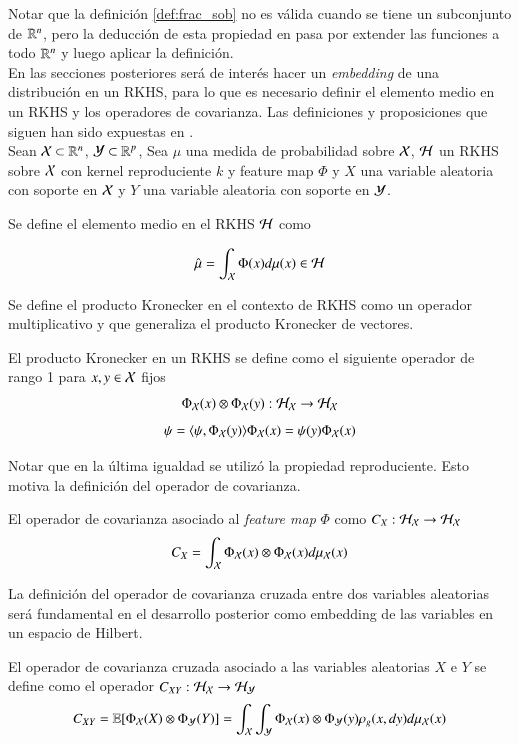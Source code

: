 Notar que la definición \ref{def:frac_sob} no es válida cuando se tiene un subconjunto de $\mathbb{R}^n$, pero la deducción de esta propiedad en \cite{Wendland2004ScatteredApproximation} pasa por extender las funciones a todo $\mathbb{R}^n$ y luego aplicar la definición. \\
En las secciones posteriores será de interés hacer un \textit{embedding} de una distribución en un RKHS, para lo que es necesario definir el elemento medio en un RKHS y los operadores de covarianza. Las definiciones y proposiciones que siguen han sido expuestas en \cite{Fukumizu2004DimensionalitySpaces, Song2009HilbertSystems, Muandet2017KernelBeyond}. \\
Sean $\mathcal{X} \subset \mathbb{R}^n$, $\mathcal{Y} \subset \mathbb{R}^p$,  Sea $\mu$ una medida de probabilidad sobre $\mathcal{X}$, $\mathcal{H}$ un RKHS sobre $\mathcal{X}$ con kernel reproduciente $k$ y feature map $\Phi$ y $X$ una variable aleatoria con soporte en $\mathcal{X}$ y $Y$ una variable aleatoria con soporte en $\mathcal{Y}$.
\begin{defn}
	Se define el elemento medio en el RKHS $\mathcal{H}$ como
	
	\begin{equation*}
		\hat \mu = \int_{\mathcal{X}} \Phi (x) d \mu (x) \in \mathcal{H}
	\end{equation*}
\end{defn}
Se define el producto Kronecker en el contexto de RKHS como un operador multiplicativo y que generaliza el producto Kronecker de vectores.
\begin{defn}
    El producto Kronecker en un RKHS se define como
    el siguiente operador de rango 1 para $x, y \in \mathcal{X}$ fijos
	$$ \Phi_{\mathcal{X}} (x) \otimes \Phi_{\mathcal{X}}(y) : \mathcal{H}_{\mathcal{X}} \to \mathcal{H}_{\mathcal{X}}$$
	\begin{equation*}
		[\Phi_\X (x) \otimes \Phi_\X(y)] \psi = \langle \psi, \Phi_\X (y) \rangle \Phi_\X (x) = \psi (y) \Phi_\X (x)
	\end{equation*}
    \label{def:kronecker}
\end{defn}
Notar que en la última igualdad se utilizó la propiedad reproduciente. Esto motiva la definición del operador de covarianza.
\begin{defn}
    El operador de covarianza asociado al \textit{feature map} $\Phi$ como $C_X : \mathcal{H}_{\mathcal{X}} \to \mathcal{H}_{\mathcal{X}}$ 
    \begin{equation*}
        C_X = \int_{\mathcal{X}} \Phi_{\mathcal{X}} (x) \otimes \Phi_{\mathcal{X}} (x) d \mu_{\mathcal{X}} (x)
    \end{equation*}
\end{defn}
La definición del operador de covarianza cruzada entre dos variables aleatorias será fundamental en el desarrollo posterior como embedding de las variables en un espacio de Hilbert.
\begin{defn}
    El operador de covarianza cruzada asociado a las variables aleatorias $X$ e $Y$ se define como el operador $C_{XY}: \mathcal{H}_{\mathcal{X}} \to \mathcal{H}_{\mathcal{Y}}$	
    \begin{equation*}
        C_{X Y} = \mathbb{E} [\Phi_{\mathcal{X}} (X) \otimes \Phi_{\mathcal{Y}} (Y)] = \int_{\mathcal{X}} \int_{\mathcal{Y}} \Phi_{\mathcal{X}} (x) \otimes \Phi_{\mathcal{Y}} (y) \rho_g (x, dy) d \mu_{\mathcal{X}} (x)
    \end{equation*}
\end{defn}

